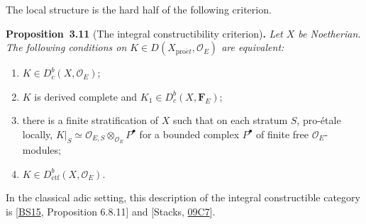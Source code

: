 \documentclass[11pt]{article}
\newenvironment{bpstatement}[2]{\par\addvspace{0.6\baselineskip}\noindent\textbf{#1}#2\textbf{.}\enspace\ignorespaces}
  {\par\addvspace{0.4\baselineskip}}
\newenvironment{bpstatementit}[2]{\begin{bpstatement}{#1}{#2}\itshape\ignorespaces}{\end{bpstatement}}
\providecommand{\Dbc}{}\renewcommand{\Dbc}{D^b_c}
\begin{document}
\label{bp33}%
The local structure is the hard half of the following criterion.

\label{bp34}%
\begin{bpstatementit}{Proposition~3.11}{ (The integral constructibility criterion)}
Let \(X\) be Noetherian. The following conditions on \(K\in D(X_{\mathrm{pro}\acute{e}t},\mathcal O_E)\) are equivalent:

\begin{enumerate}
\item \(K\in\Dbc(X,\mathcal O_E)\);
\item \(K\) is derived complete and \(K_1\in\Dbc(X,\mathbf F_E)\);
\item there is a finite stratification of \(X\) such that on each stratum \(S\), pro-étale locally, \(K|_S\simeq\mathcal O_{E,S}\otimes_{\mathcal O_E}P^\bullet\) for a bounded complex \(P^\bullet\) of finite free \(\mathcal O_E\)-modules;
\item \(K\in D^b_{\mathrm{ctf}}(X,\mathcal O_E)\).
\end{enumerate}
\end{bpstatementit}

\label{bp35}%
In the classical adic setting, this description of the integral constructible category is [\hyperref[bp93]{BS15}, Proposition 6.8.11] and [Stacks, \href{https://stacks.math.columbia.edu/tag/09C7}{09C7}].
\end{document}
